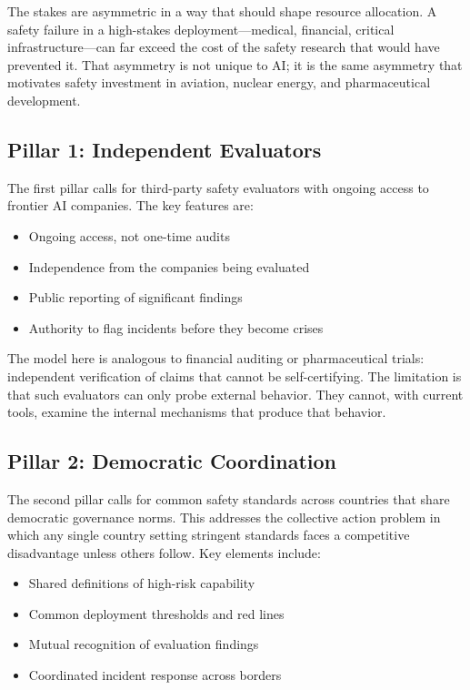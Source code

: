 \documentclass[12pt]{article}
\begin{document}
The stakes are asymmetric in a way that should shape resource allocation. A
safety failure in a high-stakes deployment---medical, financial, critical
infrastructure---can far exceed the cost of the safety research that would
have prevented it. That asymmetry is not unique to AI; it is the same
asymmetry that motivates safety investment in aviation, nuclear energy, and
pharmaceutical development.

\subsection{Pillar 1: Independent Evaluators}

The first pillar calls for third-party safety evaluators with ongoing access
to frontier AI companies. The key features are:
\begin{itemize}[noitemsep]
  \item Ongoing access, not one-time audits
  \item Independence from the companies being evaluated
  \item Public reporting of significant findings
  \item Authority to flag incidents before they become crises
\end{itemize}

The model here is analogous to financial auditing or pharmaceutical trials:
independent verification of claims that cannot be self-certifying. The
limitation is that such evaluators can only probe external behavior. They
cannot, with current tools, examine the internal mechanisms that produce that
behavior.

\subsection{Pillar 2: Democratic Coordination}

The second pillar calls for common safety standards across countries that
share democratic governance norms. This addresses the collective action
problem in which any single country setting stringent standards faces a
competitive disadvantage unless others follow. Key elements include:
\begin{itemize}[noitemsep]
  \item Shared definitions of high-risk capability
  \item Common deployment thresholds and red lines
  \item Mutual recognition of evaluation findings
  \item Coordinated incident response across borders
\end{itemize}
\end{document}
